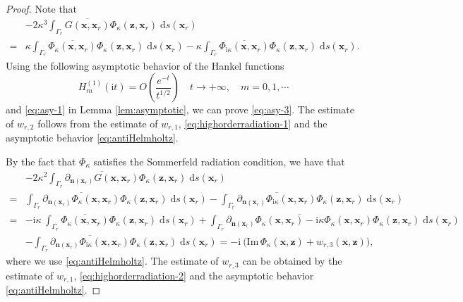 \documentclass[10pt,a4paper]{article}
\numberwithin{equation}{section}
\begin{document}
\begin{proof}
  Note that
  \begin{align*}
    &-2 \kappa^{3}\int_{ \Gamma_{r} }\overline{ G(\bm{ x },\bm{ x }_r)}\Phi_{\kappa}(\bm{ z },\bm{ x }_r) \;\mathrm{d}s(\bm{ x }_r)\\
    = & \kappa \int_{ \Gamma_{r} }\overline{ \Phi_{\kappa}(\bm{ x },\bm{ x }_r)}\Phi_{\kappa}(\bm{ z },\bm{ x }_r) \;\mathrm{d}s(\bm{ x }_r)
    - \kappa \int_{ \Gamma_{r} }\overline{ \Phi_{\mathrm{ i } \kappa}(\bm{ x },\bm{ x }_r)}\Phi_{\kappa}(\bm{ z },\bm{ x }_r) \;\mathrm{d}s(\bm{ x }_r).
  \end{align*}
  Using the following asymptotic behavior of the Hankel
functions
  \begin{equation}
    \label{eq:antiHelmholtz}
    H^{(1)}_m(\mathrm{ i } t)=O \left( \dfrac{e^{-t }}{ t ^{1/2} } \right)\quad
     t \to +\infty, \quad m = 0,1,\cdots
  \end{equation}
and \eqref{eq:asy-1} in  Lemma \ref{lem:asymptotic}, we can prove \eqref{eq:asy-3}. The estimate of $w_{r,2}$ follows from the estimate of $w_{r,1}$, \eqref{eq:highorderradiation-1} and the asymptotic behavior \eqref{eq:antiHelmholtz}.

  By the fact that $\Phi_{\kappa}$ satisfies the Sommerfeld radiation condition, we have that
  \begin{align*}
    & -2 \kappa^{2}\int_{ \Gamma_{r} }\overline{ \partial_{\bm{n}(\bm{ x }_r) } G(\bm{ x },\bm{ x }_r)}\Phi_{\kappa}(\bm{ z },\bm{ x }_r) \;\mathrm{d}s(\bm{ x }_r) \\
    = &  \int_{ \Gamma_{r} }\overline{ \partial_{\bm{n}(\bm{ x }_r) } \Phi_{\kappa}(\bm{ x },\bm{ x }_r)} \Phi_{\kappa}(\bm{ z },\bm{ x }_r) \;\mathrm{d}s(\bm{ x }_r) -  \int_{ \Gamma_{r} }\overline{ \partial_{\bm{n}(\bm{ x }_r) } \Phi_{\mathrm{ i } \kappa}(\bm{ x },\bm{ x }_r)} \Phi_{\kappa}(\bm{ z },\bm{ x }_r) \;\mathrm{d}s(\bm{ x }_r) \\
    = &  -\mathrm{ i }\kappa~  \int_{ \Gamma_{r} }\overline{ \Phi_{\kappa}(\bm{ x },\bm{ x }_r)}\Phi_{\kappa}(\bm{ z },\bm{ x }_r) \;\mathrm{d}s(\bm{ x }_r) +
        \int_{ \Gamma_{r} }\overline{ \partial_{\bm{n}(\bm{ x }_r) } \Phi_{\kappa}(\bm{ x },\bm{ x }_r)-\mathrm{ i } \kappa  \Phi_{\kappa}(\bm{ x },\bm{ x }_r) } \Phi_{\kappa}(\bm{ z },\bm{ x }_r) \;\mathrm{d}s(\bm{ x }_r) \\
    & -  \int_{ \Gamma_{r} }\overline{ \partial_{\bm{n}(\bm{ x }_r) } \Phi_{\mathrm{ i } \kappa}(\bm{ x },\bm{ x }_r)} \Phi_{\kappa}(\bm{ z },\bm{ x }_r) \;\mathrm{d}s(\bm{ x }_r) 
     =  -\mathrm{ i }~ \big( \mathrm{Im}\, \Phi_{\kappa} (\bm{ x }, \bm{ z }) + w_{r,3} (\bm{ x }, \bm{ z }) \big),
   \end{align*}
   where we use \eqref{eq:antiHelmholtz}. The estimate of $w_{r,3}$ can be obtained by the estimate of $w_{r,1}$, \eqref{eq:highorderradiation-2} and
   the asymptotic behavior \eqref{eq:antiHelmholtz}.


\end{proof}
\end{document}
